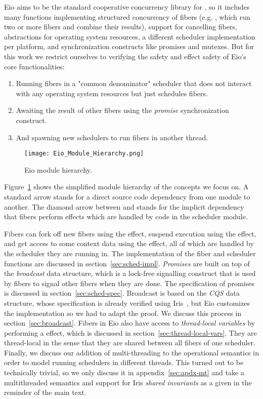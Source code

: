 Eio aims to be the standard cooperative concurrency library for \ocf{},
so it includes many functions implementing structured concurrency of fibers (e.g. , which run two or more fibers and combine their results),
support for cancelling fibers, abstractions for operating system resources,
a different scheduler implementation per platform, and synchronization constructs like promises and mutexes.
But for this work we restrict ourselves to verifying the safety and effect safety of Eio's core functionalities:
\begin{enumerate}
  \item Running fibers in a "common denominator" scheduler that does not interact with any operating system resources but just schedules fibers.
  \item Awaiting the result of other fibers using the \emph{promise} synchronization construct.
  \item And spawning new schedulers to run fibers in another thread.
\end{enumerate}

\begin{figure}[ht]
  \centering
  \texttt{[image: Eio\_Module\_Hierarchy.png]}
  \caption{Eio module hierarchy.}
  \label{fig:eio-module-hierarchy}
\end{figure}

Figure~\ref{fig:eio-module-hierarchy} shows the simplified module hierarchy of the concepts we focus on.
A standard arrow stands for a direct source code dependency from one module to another.
The diamond arrow between  and  stands for the implicit dependency that fibers perform effects which are handled by code in the scheduler module.

Fibers can fork off new fibers using the \efork{} effect, suspend execution using the \esuspend{} effect, and get access to some context data using the \egetctx{} effect,
all of which are handled by the scheduler they are running in.
The implementation of the fiber and scheduler functions are discussed in section~\ref{sec:sched-impl}.
\emph{Promises} are built on top of the \emph{broadcast} data structure, which is a lock-free signalling construct that is used by fibers to signal other fibers when they are done.
The specification of promises is discussed in section~\ref{sec:sched-spec}.
Broadcast is based on the \emph{CQS} data structure, whose specification is already verified using Iris~\cite{koval2023cqs}, but Eio customizes the implementation so we had to adapt the proof.
We discuss this process in section~\ref{sec:broadcast}.
Fibers in Eio also have access to \emph{thread-local variables} by performing a \egetctx{} effect, which is discussed in section~\ref{sec:thread-local-vars}.
They are thread-local in the sense that they are shared between all fibers of one scheduler.
Finally, we discuss our addition of multi-threading to the \hazel{} operational semantics in order to model running schedulers in different threads.
This turned out to be technically trivial, so we only discuss it in appendix~\ref{sec:apdx-mt} and take a multithreaded semantics and support for Iris \emph{shared invariants} as a given in the reminder of the main text.

